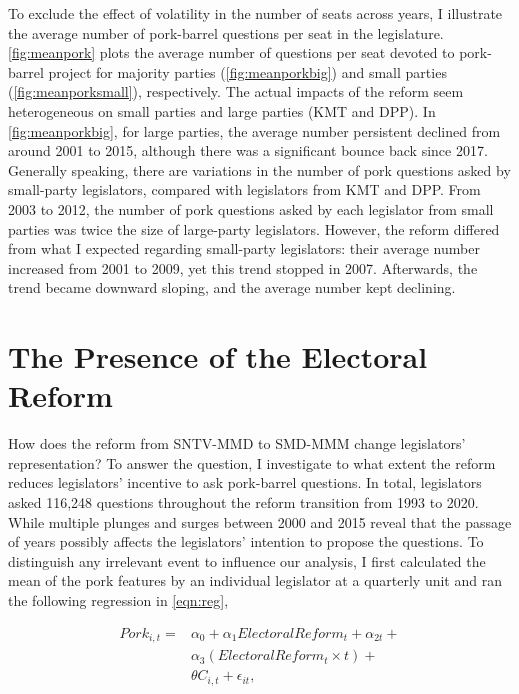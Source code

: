 To exclude the effect of volatility in the number of seats across years, I illustrate the average number of pork-barrel questions per seat in the legislature. \autoref{fig:meanpork} plots the average number of questions per seat devoted to pork-barrel project for majority parties (\autoref{fig:meanporkbig}) and small parties (\autoref{fig:meanporksmall}), respectively. The actual impacts of the reform seem heterogeneous on small parties and large parties (KMT and DPP). In \autoref{fig:meanporkbig}, for large parties, the average number persistent declined from around 2001 to 2015, although there was a significant bounce back since 2017. Generally speaking, there are variations in the number of pork questions asked by small-party legislators, compared with legislators from KMT and DPP. From 2003 to 2012, the number of pork questions asked by each legislator from small parties was twice the size of large-party legislators. However, the reform differed from what I expected regarding small-party legislators: their average number increased from 2001 to 2009, yet this trend stopped in 2007. Afterwards, the trend became downward sloping, and the average number kept declining.



\section*{\centering The Presence of the Electoral Reform}

How does the reform from SNTV-MMD to SMD-MMM change legislators' representation? To answer the question, I investigate to what extent the reform reduces legislators' incentive to ask pork-barrel questions. In total, legislators asked 116,248 questions throughout the reform transition from 1993 to 2020. While multiple plunges and surges between 2000 and 2015 reveal that the passage of years possibly affects the legislators' intention to propose the questions. To distinguish any irrelevant event to influence our analysis, I first calculated the mean of the pork features by an individual legislator at a quarterly unit and ran the following regression in \autoref{eqn:reg}, 

\begin{equation}
\begin{aligned}
 Pork_{i,t} = & \alpha_{0}+\alpha_{1}Electoral Reform_{t}+\alpha_{2t} +  \\
              & \alpha_{3}{(Electoral Reform_{t}\times{t})} +            \\
              & \theta C_{i,t}+ \epsilon_{it},
\label{eqn:reg}            
\end{aligned}
\end{equation}

